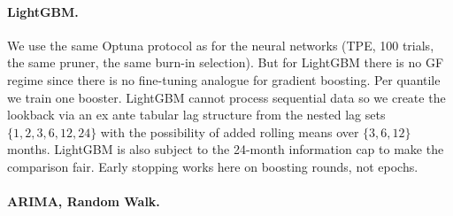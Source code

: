 \paragraph{LightGBM.}


We use the same Optuna protocol as for the neural networks (TPE, 100 trials, the same pruner, the same burn-in selection). But for LightGBM there is no GF regime since there is no fine-tuning analogue for gradient boosting. Per quantile we train one booster. LightGBM cannot process sequential data so we create the lookback via an ex ante tabular lag structure from the nested lag sets $\{1,2,3,6,12,24\}$ with the possibility of added rolling means over $\{3,6,12\}$ months. LightGBM is also subject to the 24-month information cap to make the comparison fair. Early stopping works here on boosting rounds, not epochs.

\paragraph{ARIMA, Random Walk.}



